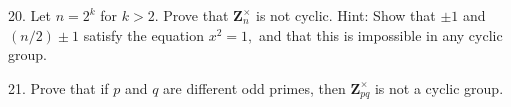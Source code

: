 \begin{mdframed}[style=darkQuesion]
  20. Let $n=2^{k}$ for $k>2 .$ Prove that $\mathbf{Z}_{n}^{\times}$ is not cyclic. 
  Hint: Show that $\pm 1$ and $(n / 2) \pm 1$ satisfy the equation $x^{2}=1,$ and that this is impossible in any cyclic group.
\end{mdframed}
\begin{mdframed}[style=darkAnswer,frametitle={Joe Starr}]
\end{mdframed}
\newpage
\begin{mdframed}[style=darkQuesion]
  21.  Prove that if $p$ and $q$ are different odd primes, then $\mathbf{Z}_{p q}^{\times}$ is not a cyclic group.
\end{mdframed}
\begin{mdframed}[style=darkAnswer,frametitle={Joe Starr}]
\end{mdframed}
\newpage